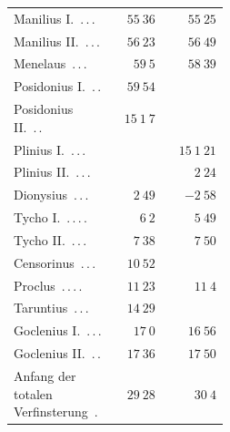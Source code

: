 \begin{center}
\begin{tabular}{@{}p{0.47\linewidth}|r|r@{}}
Manilius I.\ \mbox{.\,.\,.} & $55\ 36$ & $55\ 25$\\
Manilius II.\ \mbox{.\,.\,.} & $56\ 23$ & $56\ 49$\\
Menelaus\ \mbox{.\,.\,.} & $59\ 5$ & $58\ 39$\\
Posidonius I.\ \mbox{.\,.} & $59\ 54$ & \\
Posidonius II.\ \mbox{.\,.} & $15\ 1\ 7$ & \\
Plinius I.\ \mbox{.\,.\,.} &  & $15\ 1\ 21$\\
Plinius II.\ \mbox{.\,.\,.} &  & $2\ 24$\\
Dionysius\ \mbox{.\,.\,.} & $2\ 49$ & $-2\ 58$\\
Tycho I.\ \mbox{.\,.\,.\,.} & $6\ 2$ & $5\ 49$\\
Tycho II.\ \mbox{.\,.\,.} & $7\ 38$ & $7\ 50$\\
Censorinus\ \mbox{.\,.\,.} & $10\ 52$ & \\
Proclus\ \mbox{.\,.\,.\,.} & $11\ 23$ & $11\ 4$\\
Taruntius\ \mbox{.\,.\,.} & $14\ 29$ & \\
Goclenius I.\ \mbox{.\,.\,.} & $17\ 0$ & $16\ 56$\\
Goclenius II.\ \mbox{.\,.} & $17\ 36$ & $17\ 50$\\
Anfang der totalen Verfinsterung\ \mbox{.} & $29\ 28$ & $30\ 4$\\
\end{tabular}\endgroup\end{center}

